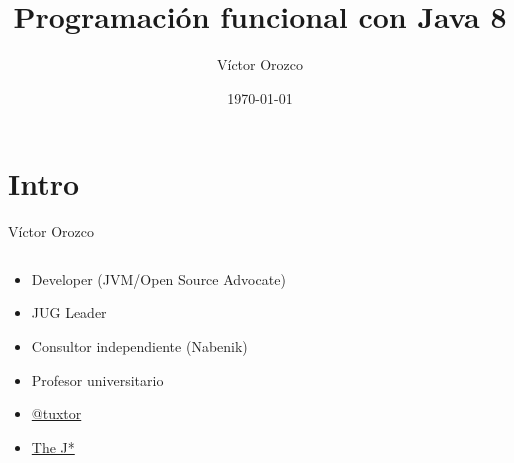 \documentclass{beamer}
\title{Programación funcional con Java 8}
\author{Víctor Orozco}
\institute{Nabenik}
\date{\today}
\begin{document}
\frame{\titlepage}

\section{Intro}


\begin{frame}{Víctor Orozco}
     \begin{columns}[T] %
	     \begin{column}[T]{5cm} %
				\begin{itemize}
				\item Developer (JVM/Open Source Advocate)
				\item JUG Leader
				\item Consultor independiente (Nabenik)
				\item Profesor universitario
				\item \href{https://twitter.com/tuxtor}{@tuxtor}
				\item \href{http://vorozco.com}{The J*} 
				\end{itemize}
	     \end{column}
	     \begin{column}[T]{5cm} %
            \begin{figure}
                \centering

\end{figure}
\end{column}
\end{columns}
\end{frame}
\end{document}

